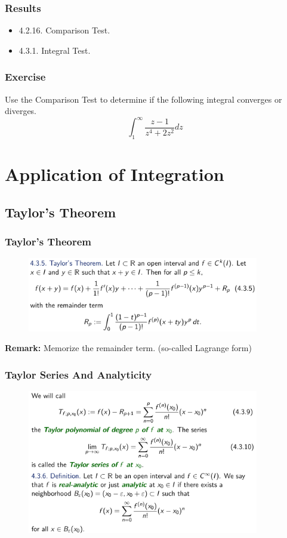 \documentclass[10pt, t]{beamer}
\begin{document}
\begin{frame}
    \frametitle{Results}
    \begin{itemize}
        \item 4.2.16. Comparison Test.
        \item 4.3.1. Integral Test.
    \end{itemize}
\end{frame}

\begin{frame}
    \frametitle{Exercise}

    Use the Comparison Test to determine if the following integral converges or diverges.
    $$\int_{1}^{\infty} \frac{z-1}{z^{4}+2 z^{2}} d z$$

\end{frame}

\section{Application of Integration}
\subsection{Taylor's Theorem}
\begin{frame}
    \frametitle{Taylor's Theorem}

    \begin{figure}[H]
        \centering
        \includegraphics[width=0.9\textwidth]{2020-12-02-13-55-33.png}
    \end{figure}
    \textbf{Remark:} Memorize the remainder term. (so-called Lagrange form)
\end{frame}

\begin{frame}
    \frametitle{Taylor Series And Analyticity}

    \begin{figure}[H]
        \centering
        \includegraphics[width=0.9\textwidth]{2020-12-02-13-59-15.png}
    \end{figure}

\end{frame}
\end{document}
